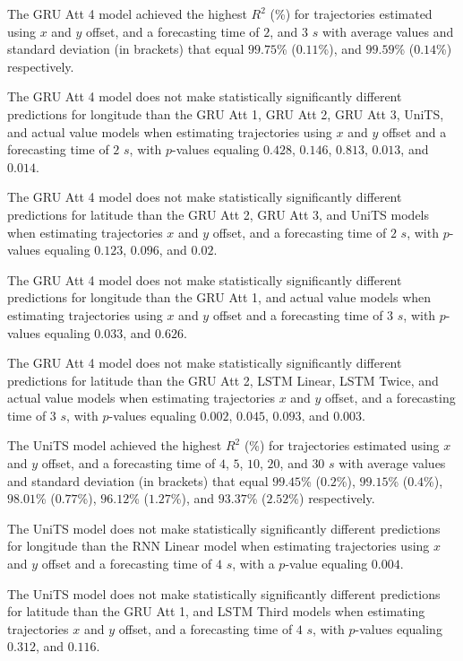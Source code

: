 The GRU Att 4 model achieved the highest $R^{2}$ (\%) for trajectories estimated using $x$ and $y$ offset, and a forecasting time of $2$, and $3$ $s$ with average values and standard deviation (in brackets) that equal $99.75$\% ($0.11$\%), and $99.59$\% ($0.14$\%) respectively.

The GRU Att 4 model does not make statistically significantly different predictions for longitude than the GRU Att 1, GRU Att 2, GRU Att 3, UniTS, and actual value models when estimating trajectories using $x$ and $y$ offset and a forecasting time of $2$ $s$, with $p$-values equaling $0.428$, $0.146$, $0.813$, $0.013$, and $0.014$.

The GRU Att 4 model does not make statistically significantly different predictions for latitude than the GRU Att 2, GRU Att 3, and UniTS models when estimating trajectories $x$ and $y$ offset, and a forecasting time of $2$ $s$, with $p$-values equaling $0.123$, $0.096$, and $0.02$.

The GRU Att 4 model does not make statistically significantly different predictions for longitude than the GRU Att 1, and actual value models when estimating trajectories using $x$ and $y$ offset and a forecasting time of $3$ $s$, with $p$-values equaling $0.033$, and $0.626$.

The GRU Att 4 model does not make statistically significantly different predictions for latitude than the GRU Att 2, LSTM Linear, LSTM Twice, and actual value models when estimating trajectories $x$ and $y$ offset, and a forecasting time of $3$ $s$, with $p$-values equaling $0.002$, $0.045$, $0.093$, and $0.003$.

The UniTS model achieved the highest $R^{2}$ (\%) for trajectories estimated using $x$ and $y$ offset, and a forecasting time of $4$, $5$, $10$, $20$, and $30$ $s$ with average values and standard deviation (in brackets) that equal $99.45$\% ($0.2$\%), $99.15$\% ($0.4$\%), $98.01$\% ($0.77$\%), $96.12$\% ($1.27$\%), and $93.37$\% ($2.52$\%) respectively.

The UniTS model does not make statistically significantly different predictions for longitude than the RNN Linear model when estimating trajectories using $x$ and $y$ offset and a forecasting time of $4$ $s$, with a $p$-value equaling $0.004$.

The UniTS model does not make statistically significantly different predictions for latitude than the GRU Att 1, and LSTM Third models when estimating trajectories $x$ and $y$ offset, and a forecasting time of $4$ $s$, with $p$-values equaling $0.312$, and $0.116$.

